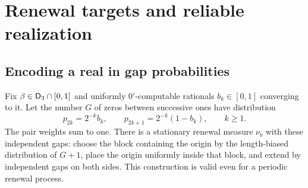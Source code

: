 \section{Renewal targets and reliable realization}\label{sec:renewal}
\subsection{Encoding a real in gap probabilities}
Fix $\beta\in\mathsf D_3\cap[0,1]$ and uniformly $0'$-computable
rationals $b_k\in[0,1]$ converging to it. Let the number $G$ of
zeros between successive ones have distribution
\begin{equation}\label{eq:gaplaw}
 p_{2k}=2^{-k}b_k,\qquad
 p_{2k+1}=2^{-k}(1-b_k),\qquad k\geq1.
\end{equation}
The pair weights sum to one. There is a stationary renewal measure
$\nu_b$ with these independent gaps: choose the block containing
the origin by the length-biased distribution of $G+1$, place the
origin uniformly inside that block, and extend by independent gaps
on both sides. This construction is valid even for a periodic
renewal process.

